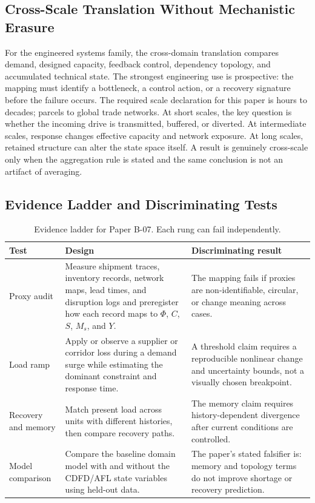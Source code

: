 \documentclass[11pt,a4paper]{article}
\begin{document}
\subsection{Cross-Scale Translation Without Mechanistic Erasure}

For the engineered systems family, the cross-domain translation compares demand, designed capacity, feedback control, dependency topology, and accumulated technical state. The strongest engineering use is prospective: the mapping must identify a bottleneck, a control action, or a recovery signature before the failure occurs. \cite{BarabasiAlbert1999,WattsStrogatz1998,Shannon1948,BakTangWiesenfeld1987}
The required scale declaration for this paper is hours to decades; parcels to global trade networks. At short
scales, the key question is whether the incoming drive is transmitted,
buffered, or diverted. At intermediate scales, response changes effective
capacity and network exposure. At long scales, retained structure can alter the
state space itself. A result is genuinely cross-scale only when the aggregation
rule is stated and the same conclusion is not an artifact of averaging.

\subsection{Evidence Ladder and Discriminating Tests}

\begin{table}[htbp]
\centering
\small
\caption{Evidence ladder for Paper B-07. Each rung can fail independently.}
\begin{tabularx}{\textwidth}{|p{}|X|X|}
\hline
\textbf{Test} & \textbf{Design} & \textbf{Discriminating result} \\
\hline
Proxy audit & Measure shipment traces, inventory records, network maps, lead times, and disruption logs and preregister how each record maps to $\Phi$, $C$, $S$, $M_s$, and $Y$. & The mapping fails if proxies are non-identifiable, circular, or change meaning across cases. \\
\hline
Load ramp & Apply or observe a supplier or corridor loss during a demand surge while estimating the dominant constraint and response time. & A threshold claim requires a reproducible nonlinear change and uncertainty bounds, not a visually chosen breakpoint. \\
\hline
Recovery and memory & Match present load across units with different histories, then compare recovery paths. & The memory claim requires history-dependent divergence after current conditions are controlled. \\
\hline
Model comparison & Compare the baseline domain model with and without the CDFD/AFL state variables using held-out data. & The paper's stated falsifier is: memory and topology terms do not improve shortage or recovery prediction. \\
\hline
\end{tabularx}
\end{table}
\end{document}
